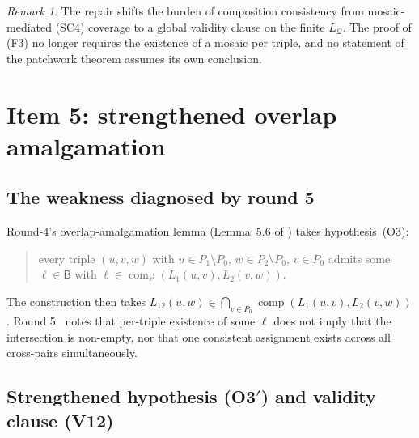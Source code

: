 \documentclass[11pt]{article}
\theoremstyle{definition}
\theoremstyle{remark}
\newtheorem{remark}[theorem]{Remark}
\newcommand{\Base}{\mathsf{B}}
\newcommand{\comp}{\operatorname{comp}}
\newcommand{\Q}{\mathcal{Q}}
\begin{document}
\begin{remark}
The repair shifts the burden of composition consistency from
mosaic-mediated (SC4) coverage to a global validity clause on the
finite $L_\Q$.  The proof of (F3) no longer requires the existence
of a mosaic per triple, and no statement of the patchwork theorem
assumes its own conclusion.
\end{remark}

\section{Item 5: strengthened overlap amalgamation}
\label{sec:item5}

\subsection{The weakness diagnosed by round 5}

Round-4's overlap-amalgamation lemma (Lemma~5.6 of
\cite{GPT55Repaired}) takes hypothesis~(O3):
\begin{quote}
every triple $(u,v,w)$ with $u\in P_1\setminus P_0$,
$w\in P_2\setminus P_0$, $v\in P_0$ admits some
$\ell\in\Base$ with $\ell\in\comp(L_1(u,v),L_2(v,w))$.
\end{quote}
The construction then takes $L_{12}(u,w)\in\bigcap_{v\in P_0}
\comp(L_1(u,v),L_2(v,w))$.  Round 5~\cite{GPT55Round5Review} notes
that per-triple existence of some $\ell$ does not imply that the
intersection is non-empty, nor that one consistent assignment
exists across all cross-pairs simultaneously.

\subsection{Strengthened hypothesis (O3$'$) and validity clause (V12)}
\end{document}
